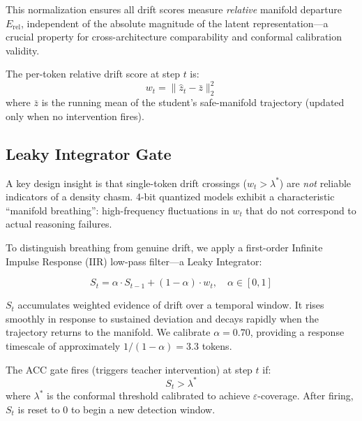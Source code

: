 \documentclass[runningheads]{llncs}
\newcommand{\lstar}{\lambda^*}
\newcommand{\Erel}{E_\mathrm{rel}}
\begin{document}
This normalization ensures all drift scores measure \emph{relative} manifold
departure $\Erel$, independent of the absolute magnitude of the latent
representation---a crucial property for cross-architecture comparability
and conformal calibration validity.

\begin{definition}
  The per-token relative drift score at step $t$ is:
  \begin{equation}
    w_t = \|\hat{z}_t - \bar{z}\|_2^2
  \end{equation}
  where $\bar{z}$ is the running mean of the student's safe-manifold
  trajectory (updated only when no intervention fires).
\end{definition}

\subsection{Leaky Integrator Gate}

A key design insight is that single-token drift crossings ($w_t > \lstar$)
are \emph{not} reliable indicators of a density chasm. 4-bit quantized models
exhibit a characteristic ``manifold breathing'': high-frequency fluctuations
in $w_t$ that do not correspond to actual reasoning failures.

To distinguish breathing from genuine drift, we apply a first-order
Infinite Impulse Response (IIR) low-pass filter---a Leaky Integrator:

\begin{equation}
  S_t = \alpha \cdot S_{t-1} + (1-\alpha) \cdot w_t, \quad \alpha \in [0,1]
  \label{eq:leaky}
\end{equation}

$S_t$ accumulates weighted evidence of drift over a temporal window.
It rises smoothly in response to sustained deviation and decays rapidly
when the trajectory returns to the manifold. We calibrate $\alpha = 0.70$,
providing a response timescale of approximately $1/(1-\alpha) = 3.3$ tokens.

\begin{definition}
  The ACC gate fires (triggers teacher intervention) at step $t$ if:
  \begin{equation}
    S_t > \lstar
    \label{eq:gate}
  \end{equation}
  where $\lstar$ is the conformal threshold calibrated to achieve
  $\varepsilon$-coverage. After firing, $S_t$ is reset to 0
  to begin a new detection window.
\end{definition}
\end{document}
